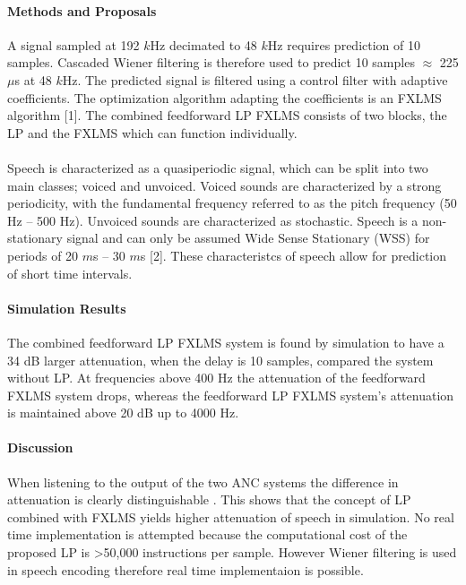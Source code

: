 \documentclass[a4paper]{article}
\begin{document}
	\paragraph{Methods and Proposals}
	A signal sampled at 192 $k$Hz decimated to 48 $k$Hz requires prediction of 10 samples. Cascaded Wiener filtering is therefore used to predict 10 samples $\approx$ 225 $\mu$s at 48 $k$Hz. The predicted signal is filtered using a control filter with adaptive coefficients. The optimization algorithm adapting the coefficients is an FXLMS algorithm [1]. The combined feedforward LP FXLMS consists of two blocks, the LP and the FXLMS which can  function individually.
	\\\\
	Speech is characterized as a quasiperiodic signal, which can be split into two main classes; voiced and unvoiced. Voiced sounds are characterized by a strong periodicity, with the fundamental frequency referred to as the pitch frequency (50 Hz -- 500 Hz). Unvoiced sounds are characterized as stochastic. Speech is a non-stationary signal and can only be assumed Wide Sense Stationary (WSS) for periods of 20 $m$s -- 30 $m$s [2]. These characteristcs of speech allow for prediction of short time intervals.     




	\paragraph{Simulation Results}
	The combined feedforward LP FXLMS system is found by simulation to have a 34 dB larger attenuation, when the delay is 10 samples, compared the system without LP. At frequencies above 400 Hz the attenuation of the feedforward FXLMS system drops, whereas the feedforward LP FXLMS system's attenuation is maintained above 20 dB up to 4000 Hz.

	\paragraph{Discussion}
	When listening to the output of the two ANC systems the difference in attenuation is clearly distinguishable . This shows that the concept of LP combined with FXLMS yields higher attenuation of speech in simulation. No real time implementation is attempted because the computational cost of the proposed LP is >50,000 instructions per sample. However Wiener filtering is used in speech encoding therefore real time implementaion is possible. 
	
\end{document}
